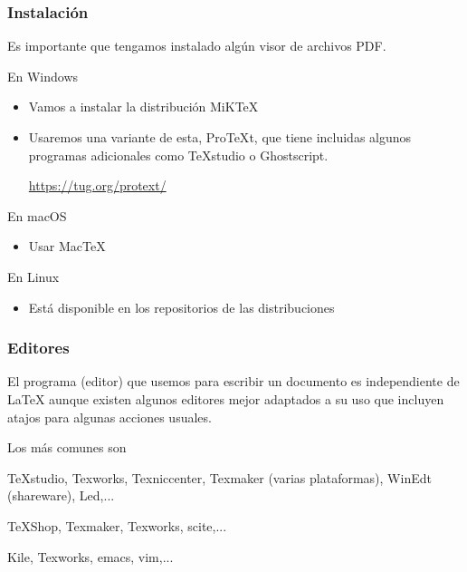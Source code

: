 \documentclass[10pt,xcolor=svgnames]{beamer}
\begin{document}
\begin{frame}
\frametitle{Instalación}

Es importante que tengamos instalado algún visor de archivos PDF.

\begin{block}{En Windows \faWindows}
    \begin{itemize}
        \item Vamos a instalar la distribución MiK\TeX
        \item Usaremos una variante de esta, \alert{Pro\TeX{t}}, que tiene incluidas algunos programas adicionales como TeXstudio o Ghostscript. 

        \centerline{\small \url{https://tug.org/protext/}}

    \end{itemize}
\end{block}


\begin{block}{En macOS \faApple}
    \begin{itemize}
        \item Usar \alert{Mac\TeX{}}  
    \end{itemize}
\end{block}

\begin{block}{En Linux \faLinux}
    \begin{itemize}
        \item Está disponible en los repositorios de las distribuciones
    \end{itemize}
\end{block}
\end{frame}


\begin{frame}
\frametitle{Editores}

El programa (editor) que usemos para escribir un documento es independiente de \LaTeX{} aunque existen algunos editores mejor adaptados a su uso que incluyen atajos para algunas acciones usuales.

\medskip

Los más comunes son
\begin{description}
	\addtolength{\itemsep}{0.5\baselineskip}
	\item[\faWindows] TeXstudio, Texworks, Texniccenter, Texmaker (varias plataformas), WinEdt (shareware), Led,...
	\item[\faApple] TeXShop, Texmaker, Texworks, scite,...
	\item[\faLinux] Kile, Texworks, emacs, vim,...
\end{description}
\end{frame}
\end{document}

